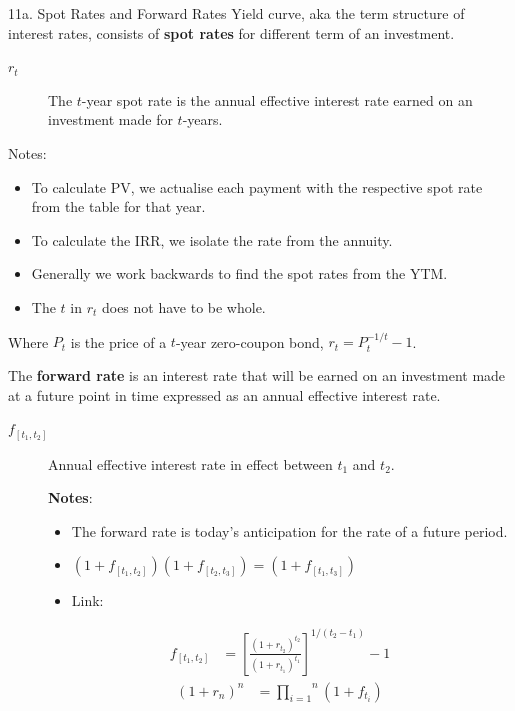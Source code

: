 \begin{CHPT_SUMM_AUTO}[label = {L.-11a}]{11a. Spot Rates and Forward Rates}
Yield curve, aka the term structure of interest rates, consists of \textbf{spot rates} for different term of an investment.

\begin{description}
	\item[$r_{t}$]	The $t$-year spot rate is the annual effective interest rate earned on an investment made for $t$-years.
\end{description}

Notes:
\begin{itemize}[leftmargin = *]
	\item	To calculate PV, we actualise each payment with the respective spot rate from the table for that year.
	\item	To calculate the IRR, we isolate the rate from the annuity.
	\item	Generally we work backwards to find the spot rates from the YTM.
	\item	The $t$ in $r_{t}$ does not have to be whole.
\end{itemize}

Where $P_{t}$ is the price of a $t$-year zero-coupon bond, $r_{t} = P_{t}^{-1/t} - 1$.

\tcbline

The \textbf{forward rate} is an interest rate that will be earned on an investment made at a future point in time expressed as an annual effective interest rate.
\begin{description}
	\item[$f_{[t_{1}, t_{2}]}$]	Annual effective interest rate in effect between $t_{1}$ and $t_{2}$.

\textbf{Notes}:
\begin{itemize}[leftmargin = *]
	\item	The forward rate is today's anticipation for the rate of a future period.
	\item	$(1 + f_{[t_{1}, t_{2}]})(1 + f_{[t_{2}, t_{3}]}) = (1 + f_{[t_{1}, t_{3}]})$
	\item	Link:
\end{itemize}
	\begin{align*}
	f_{[t_{1}, t_{2}]}
	&=	\left[\frac{(1 + r_{t_{2}})^{t_{2}}}{(1 + r_{t_{1}})^{t_{1}}}\right]^{1/(t_{2} - t_{1})} - 1
	\end{align*}			
		\begin{align*}
		(1 + r_{n})^{n} 
		&=	\overset{n}{\underset{i = 1}{\prod}} (1 + f_{t_{i}})
		\end{align*}
\end{description}
\end{CHPT_SUMM_AUTO}

